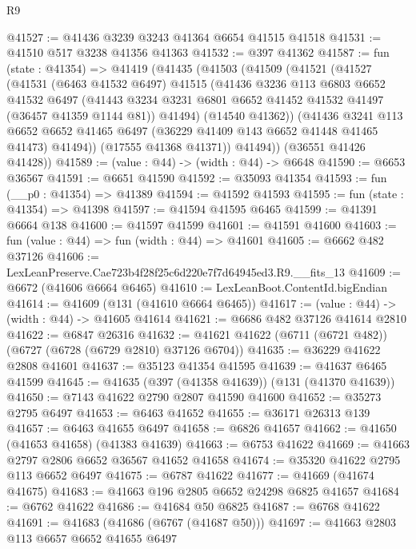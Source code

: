 \begin{lexlean}{R9}
\begin{coremodule}
@41527 := @41436 @3239 @3243 @41364 @6654 @41515 @41518
@41531 := @41510 @517 @3238 @41356 @41363
@41532 := @397 @41362
@41587 := fun (state : @41354) =>
  @41419
    (@41435
      (@41503
        (@41509
          (@41521
            (@41527
              (@41531
                (@6463 @41532 @6497)
                @41515
                (@41436
                  @3236
                  @113
                  @6803
                  @6652
                  @41532
                  @6497
                  (@41443 @3234 @3231 @6801 @6652 @41452 @41532 @41497 (@36457 @41359 @1144 @81))
                  @41494)
                (@14540 @41362))
              (@41436
                @3241
                @113
                @6652
                @6652
                @41465
                @6497
                (@36229 @41409 @143 @6652 @41448 @41465 @41473)
                @41494))
            (@17555 @41368 @41371))
          @41494))
      (@36551 @41426 @41428))
@41589 := (value : @44) -> (width : @44) -> @6648
@41590 := @6653 @36567
@41591 := @6651 @41590
@41592 := @35093 @41354
@41593 := fun (__p0 : @41354) => @41389
@41594 := @41592 @41593
@41595 := fun (state : @41354) => @41398
@41597 := @41594 @41595 @6465
@41599 := @41391 @6664 @138
@41600 := @41597 @41599
@41601 := @41591 @41600
@41603 := fun (value : @44) => fun (width : @44) => @41601
@41605 := @6662 @482 @37126
@41606 := LexLeanPreserve.Cae723b4f28f25c6d220e7f7d64945ed3.R9.__fits_13
@41609 := @6672 (@41606 @6664 @6465)
@41610 := LexLeanBoot.ContentId.bigEndian
@41614 := @41609 (@131 (@41610 @6664 @6465))
@41617 := (value : @44) -> (width : @44) -> @41605 @41614
@41621 := @6686 @482 @37126 @41614 @2810
@41622 := @6847 @26316
@41632 := @41621 @41622 (@6711 (@6721 @482)) (@6727 (@6728 (@6729 @2810) @37126 @6704))
@41635 := @36229 @41622 @2808 @41601
@41637 := @35123 @41354 @41595
@41639 := @41637 @6465 @41599
@41645 := @41635 (@397 (@41358 @41639)) (@131 (@41370 @41639))
@41650 := @7143 @41622 @2790 @2807 @41590 @41600
@41652 := @35273 @2795 @6497
@41653 := @6463 @41652
@41655 := @36171 @26313 @139
@41657 := @6463 @41655 @6497
@41658 := @6826 @41657
@41662 := @41650 (@41653 @41658) (@41383 @41639)
@41663 := @6753 @41622
@41669 := @41663 @2797 @2806 @6652 @36567 @41652 @41658
@41674 := @35320 @41622 @2795 @113 @6652 @6497
@41675 := @6787 @41622
@41677 := @41669 (@41674 @41675)
@41683 := @41663 @196 @2805 @6652 @24298 @6825 @41657
@41684 := @6762 @41622
@41686 := @41684 @50 @6825
@41687 := @6768 @41622
@41691 := @41683 (@41686 (@6767 (@41687 @50)))
@41697 := @41663 @2803 @113 @6657 @6652 @41655 @6497

\end{coremodule}
\end{lexlean}
